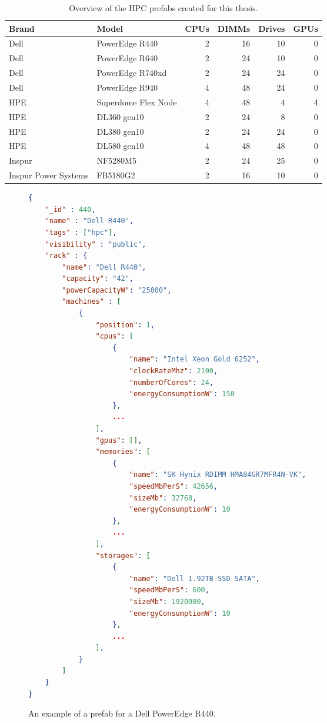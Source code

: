 \documentclass[11pt]{article}
\begin{document}
			\begin{table}[]
			\centering
				\begin{tabular}{llrrrr}
					\toprule
					Brand       & Model        & CPUs & DIMMs & Drives & GPUs \\ \midrule
					Dell                 & PowerEdge R440      & 2             & 16             & 10              & 0             \\
					Dell                 & PowerEdge R640      & 2             & 24             & 10              & 0             \\
					Dell                 & PowerEdge R740xd    & 2             & 24             & 24              & 0             \\
					Dell                 & PowerEdge R940      & 4             & 48             & 24              & 0             \\
					HPE                  & Superdome Flex Node & 4             & 48             & 4               & 4             \\
					HPE                  & DL360 gen10         & 2             & 24             & 8               & 0             \\
					HPE                  & DL380 gen10         & 2             & 24             & 24              & 0             \\
					HPE                  & DL580 gen10         & 4             & 48             & 48              & 0             \\
					Inspur               & NF5280M5            & 2             & 24             & 25              & 0             \\
					Inspur Power Systems & FB5180G2            & 2             & 16             & 10              & 0             \\ \bottomrule
				\end{tabular}
			\caption[Overview of the HPC prefabs created for this thesis]{Overview of the HPC prefabs created for this thesis.}
			\label{tab:2}
			\end{table}
			\newpage
			\begin{figure}[]
			\centering
				\begin{lstlisting}[language=json]
{
	"_id" : 440,
	"name" : "Dell R440",
	"tags" : ["hpc"],
	"visibility" : "public",
	"rack" : {
		"name": "Dell R440",
		"capacity": "42",
		"powerCapacityW": "25000",
		"machines" : [
			{
				"position": 1,
				"cpus": [
					{
						"name": "Intel Xeon Gold 6252",
						"clockRateMhz": 2100,
						"numberOfCores": 24,
						"energyConsumptionW": 150
					},
					...
				],
				"gpus": [],
				"memories": [
					{
						"name": "SK Hynix RDIMM HMA84GR7MFR4N-VK",
						"speedMbPerS": 42656,
						"sizeMb": 32768,
						"energyConsumptionW": 10
					},
					...
				],
				"storages": [
					{
						"name": "Dell 1.92TB SSD SATA",
						"speedMbPerS": 600,
						"sizeMb": 1920000,
						"energyConsumptionW": 10
					},
					...
				],
			}
		]
	}
}			\end{lstlisting}
				\caption[An example of a topology module for a Dell PowerEdge R440]{An example of a prefab for a Dell PowerEdge R440.}
				\label{fig:3}
			\end{figure}
\end{document}
